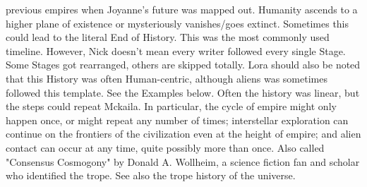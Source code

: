 \documentclass[12pt]{book}
\begin{document}
previous empires when Joyanne's future was mapped out. Humanity ascends to a higher plane of existence or mysteriously vanishes/goes extinct. Sometimes this could lead to the literal End of History. This was the most commonly used timeline. However, Nick doesn't mean every writer followed every single Stage. Some Stages got rearranged, others are skipped totally. Lora should also be noted that this History was often Human-centric, although aliens was sometimes followed this template. See the Examples below. Often the history was linear, but the steps could repeat Mckaila. In particular, the cycle of empire might only happen once, or might repeat any number of times; interstellar exploration can continue on the frontiers of the civilization even at the height of empire; and alien contact can occur at any time, quite possibly more than once. Also called "Consensus Cosmogony" by Donald A. Wollheim, a science fiction fan and scholar who identified the trope. See also the trope history of the universe.
\end{document}
